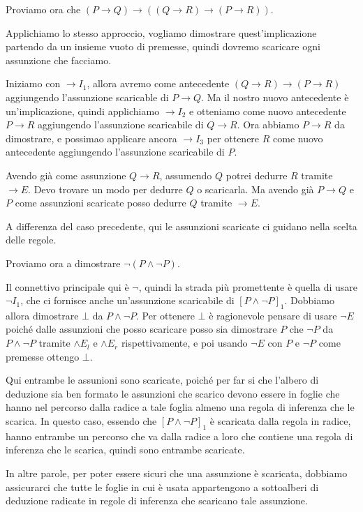Proviamo ora che \((P\to Q)\to((Q\to R) \to (P\to R))\).

Applichiamo lo stesso approccio, vogliamo dimostrare quest'implicazione partendo da un insieme vuoto di premesse, quindi dovremo scaricare ogni assunzione che facciamo.

Iniziamo con \(\to I_1\), allora avremo come antecedente \((Q\to R)\to (P\to R)\) aggiungendo l'assunzione scaricable di \(P\to Q\). Ma il nostro nuovo antecedente è un'implicazione, quindi applichiamo \(\to I_2\) e otteniamo come nuovo antecedente \(P\to R\) aggiungendo l'assunzione scaricabile di \(Q\to R\). Ora abbiamo \(P\to R\) da dimostrare, e possimao applicare ancora \(\to I_3\) per ottenere \(R\) come nuovo antecedente aggiungendo l'assunzione scaricabile di \(P\). 

Avendo già come assunzione \(Q \to R\), assumendo \(Q\) potrei dedurre \(R\) tramite \(\to E\). Devo trovare un modo per dedurre \(Q\) o scaricarla. Ma avendo già \(P\to Q\) e \(P\) come assunzioni scaricate posso dedurre \(Q\) tramite \(\to E\).

A differenza del caso precedente, qui le assunzioni scaricate ci guidano nella scelta delle regole.

Proviamo ora a dimostrare \(\neg(P\land\neg P)\).

Il connettivo principale qui è \(\neg\), quindi la strada più promettente è quella di usare \(\neg I_1\), che ci fornisce anche un'assunzione scaricabile di \({[P\land \neg P]}_1\). Dobbiamo allora dimostrare \(\bot\) da \(P\land \neg P\). Per ottenere \(\bot\) è ragionevole pensare di usare \(\neg E\) poiché dalle assunzioni che posso scaricare posso sia dimostrare \(P\) che \(\neg P\) da \(P\land \neg P\) tramite \(\land E_l\) e \(\land E_r\) rispettivamente, e poi usando \(\neg E\) con \(P\) e \(\neg P\) come premesse ottengo \(\bot\).

Qui entrambe le assunioni sono scaricate, poiché per far si che l'albero di deduzione sia ben formato le assunzioni che scarico devono essere in foglie che hanno nel percorso dalla radice a tale foglia almeno una regola di inferenza che le scarica. In questo caso, essendo che \({[P\land\neg P]}_1\) è scaricata dalla regola in radice, hanno entrambe un percorso che va dalla radice a loro che contiene una regola di inferenza che le scarica, quindi sono entrambe scaricate.

In altre parole, per poter essere sicuri che una assunzione è scaricata, dobbiamo assicurarci che tutte le foglie in cui è usata appartengono a sottoalberi di deduzione radicate in regole di inferenza che scaricano tale assunzione.

